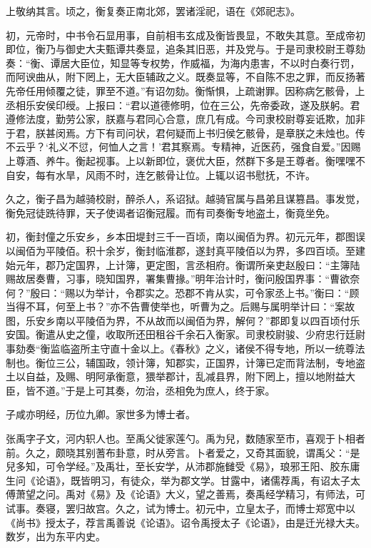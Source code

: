 \documentclass[12pt,UTF8]{ctexbook}
\begin{document}
上敬纳其言。顷之，衡复奏正南北郊，罢诸淫祀，语在《郊祀志》。



初，元帝时，中书令石显用事，自前相韦玄成及衡皆畏显，不敢失其意。至成帝初即位，衡乃与御史大夫甄谭共奏显，追条其旧恶，并及党与。于是司隶校尉王尊劾奏：“衡、谭居大臣位，知显等专权势，作威福，为海内患害，不以时白奏行罚，而阿谀曲从，附下罔上，无大臣辅政之义。既奏显等，不自陈不忠之罪，而反扬著先帝任用倾覆之徒，罪至不道。”有诏勿劾。衡惭惧，上疏谢罪。因称病乞骸骨，上丞相乐安侯印绶。上报曰：“君以道德修明，位在三公，先帝委政，遂及朕躬。君遵修法度，勤劳公家，朕嘉与君同心合意，庶几有成。今司隶校尉尊妄诋欺，加非于君，朕甚闵焉。方下有司问状，君何疑而上书归侯乞骸骨，是章朕之未烛也。传不云乎？‘礼义不愆，何恤人之言！’君其察焉。专精神，近医药，强食自爱。”因赐上尊酒、养牛。衡起视事。上以新即位，褒优大臣，然群下多是王尊者。衡嘿嘿不自安，每有水旱，风雨不时，连乞骸骨让位。上辄以诏书慰抚，不许。



久之，衡子昌为越骑校尉，醉杀人，系诏狱。越骑官属与昌弟且谋篡昌。事发觉，衡免冠徒跣待罪，天子使谒者诏衡冠履。而有司奏衡专地盗土，衡竟坐免。



初，衡封僮之乐安乡，乡本田堤封三千一百顷，南以闽佰为界。初元元年，郡图误以闽佰为平陵佰。积十余岁，衡封临淮郡，遂封真平陵佰以为界，多四百顷。至建始元年，郡乃定国界，上计簿，更定图，言丞相府。衡谓所亲吏赵殷曰：“主簿陆赐故居奏曹，习事，晓知国界，署集曹掾。”明年治计时，衡问殷国界事：“曹欲奈何？”殷曰：“赐以为举计，令郡实之。恐郡不肯从实，可令家丞上书。”衡曰：“顾当得不耳，何至上书？”亦不告曹使举也，听曹为之。后赐与属明举计曰：“案故图，乐安乡南以平陵佰为界，不从故而以闽佰为界，解何？”郡即复以四百顷付乐安国。衡遣从史之僮，收取所还田租谷千余石入衡家。司隶校尉骏、少府忠行廷尉事劾奏“衡监临盗所主守直十金以上。《春秋》之义，诸侯不得专地，所以一统尊法制也。衡位三公，辅国政，领计簿，知郡实，正国界，计簿已定而背法制，专地盗土以自益，及赐、明阿承衡意，猥举郡计，乱减县界，附下罔上，擅以地附益大臣，皆不道。”于是上可其奏，勿治，丞相免为庶人，终于家。



子咸亦明经，历位九卿。家世多为博士者。



张禹字子文，河内轵人也。至禹父徙家莲勺。禹为兒，数随家至市，喜观于卜相者前。久之，颇晓其别蓍布卦意，时从旁言。卜者爱之，又奇其面貌，谓禹父：“是兒多知，可令学经。”及禹壮，至长安学，从沛郡施雠受《易》，琅邪王阳、胶东庸生问《论语》，既皆明习，有徒众，举为郡文学。甘露中，诸儒荐禹，有诏太子太傅萧望之问。禹对《易》及《论语》大义，望之善焉，奏禹经学精习，有师法，可试事。奏寝，罢归故宫。久之，试为博士。初元中，立皇太子，而博士郑宽中以《尚书》授太子，荐言禹善说《论语》。诏令禹授太子《论语》，由是迁光禄大夫。数岁，出为东平内史。
\end{document}
